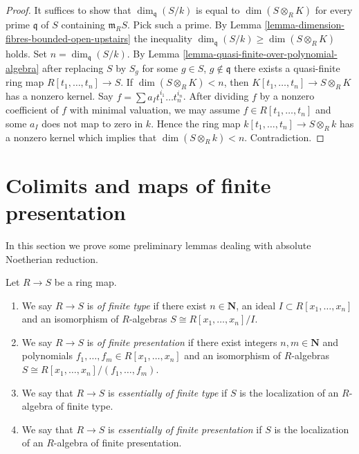 \begin{proof}
It suffices to show that $\dim_{\mathfrak q}(S/k)$ is equal
to $\dim(S \otimes_R K)$ for every prime $\mathfrak q$ of
$S$ containing $\mathfrak m_RS$. Pick such a prime. By
Lemma \ref{lemma-dimension-fibres-bounded-open-upstairs}
the inequality $\dim_{\mathfrak q}(S/k) \geq \dim(S\otimes_R K)$
holds. Set $n = \dim_{\mathfrak q}(S/k)$. By
Lemma \ref{lemma-quasi-finite-over-polynomial-algebra}
after replacing $S$ by $S_g$ for some $g \in S$, $g \not \in \mathfrak q$
there exists a quasi-finite ring map
$R[t_1, \ldots, t_n] \to S$. If $\dim(S \otimes_R K) < n$,
then $K[t_1, \ldots, t_n] \to S \otimes_R K$ has a nonzero kernel.
Say $f = \sum a_I t_1^{i_1}\ldots t_n^{i_n}$. After dividing
$f$ by a nonzero coefficient of $f$ with minimal valuation, we may
assume $f\in R[t_1, \ldots, t_n]$ and some $a_I$ does not map
to zero in $k$. Hence the ring map $k[t_1, \ldots, t_n] \to S\otimes_R k$
has a nonzero kernel which implies that $\dim(S\otimes_R k) < n$.
Contradiction.
\end{proof}
























\section{Colimits and maps of finite presentation}
\label{section-colimits-flat}

\noindent
In this section we prove some preliminary lemmas
dealing with absolute Noetherian reduction.

\begin{definition}
\label{definition-essentially-finite-p-t}
Let $R \to S$ be a ring map.
\begin{enumerate}
\item We say $R \to S$ is {\it of finite type} if there exist
$n \in \mathbf{N}$, an ideal $I \subset R[x_1,\ldots,x_n]$ and
an isomorphism of $R$-algebras $S \cong R[x_1,\ldots,x_n]/I$.
\item We say $R \to S$ is {\it of finite presentation} if there
exist integers $n,m \in \mathbf{N}$ and polynomials
$f_1,\ldots,f_m \in R[x_1,\ldots,x_n]$
and an isomorphism of $R$-algebras
$S \cong R[x_1,\ldots,x_n]/(f_1,\ldots,f_m)$.
\item We say that $R \to S$ is {\it essentially of finite type} if
$S$ is the localization of an $R$-algebra of finite type.
\item We say that $R \to S$ is {\it essentially of finite presentation} if
$S$ is the localization of an $R$-algebra of finite presentation.
\end{enumerate}
\end{definition}

